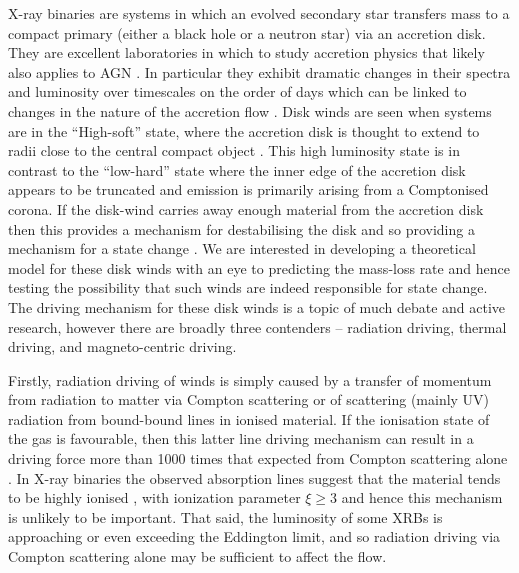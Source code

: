 \documentclass[a4paper,fleqn,usenatbib]{mnras}
\begin{document}
X-ray binaries are systems in 
which an evolved secondary star transfers mass to a compact primary (either a black hole or a neutron star)
via an accretion disk. They are excellent laboratories in which to study accretion physics that likely also applies to AGN
\citep{2003MNRAS.345L..19M,2004A&A...414..895F,2006MNRAS.372.1366K}.
In particular they exhibit dramatic changes in their spectra and luminosity over timescales on the order of days
\cite[e.g.][]{1999ApJ...520..776S,2004ApJ...610..378P} which can be linked to changes in the nature of the accretion flow \cite[e.g.][]{1995PASP..107.1207N,2012Sci...337..540F}. Disk winds are seen when 
systems are in the ``High-soft'' state, where the accretion disk is thought to extend to radii close to the 
central compact object \cite[][although also see \citealt{2016ApJ...830L...5H}]{2012MNRAS.422L..11P}. This high luminosity state is in contrast to the ``low-hard'' state
where the inner edge of the accretion disk appears to be truncated and emission is primarily arising from a Comptonised
corona. If the disk-wind carries away enough material from the accretion disk then this provides a mechanism for
destabilising the disk and so providing a mechanism for a state change \cite{1986ApJ...306...90S}. We are
interested in developing a theoretical model for these disk winds with an eye to predicting the mass-loss rate
and hence testing the possibility that such winds are indeed responsible for state change. 
The driving mechanism for these disk winds is a topic of much debate and active research, however there are broadly
three contenders -- radiation driving, thermal driving, and magneto-centric driving. 

Firstly, radiation driving of winds is simply caused by a transfer of momentum from radiation to matter via Compton
scattering or of scattering (mainly UV) radiation
from bound-bound lines in ionised material. If the ionisation state of the gas is 
favourable, then this latter line driving mechanism can
result in a driving force more than  1000 times that expected from Compton scattering alone \citep{1975ApJ...195..157C}.
 In X-ray binaries
the observed absorption lines suggest that the material tends to be highly ionised \citep[e.g.][]{2009ApJ...701..865K,
2018ApJ...861...26A}, with ionization parameter $\xi \geq 3$
\citep{2016AN....337..368D} and hence this mechanism is unlikely to be important. That said, the luminosity of 
some XRBs is 
approaching or even exceeding the Eddington limit, and so radiation driving via Compton scattering alone 
may be sufficient to affect the
flow.
\end{document}
